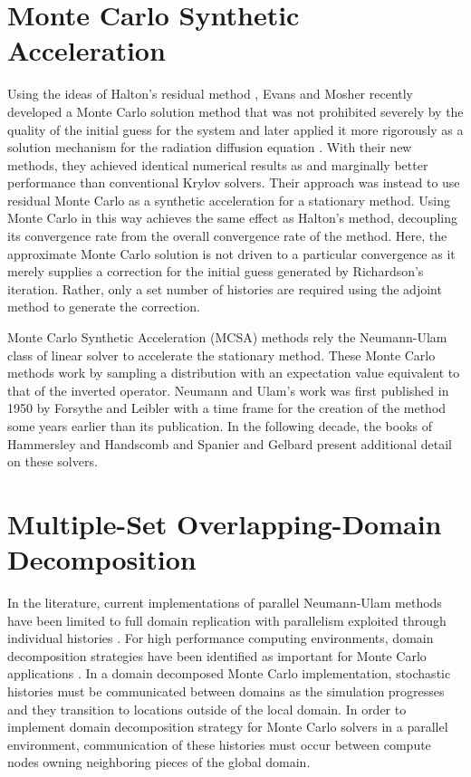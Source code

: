 \documentclass{snamc2013}
\begin{document}
\section{Monte Carlo Synthetic Acceleration}

Using the ideas of Halton's residual method
\cite{halton_sequential_1994}, Evans and Mosher recently developed a
Monte Carlo solution method that was not prohibited severely by the
quality of the initial guess for the system \cite{evans_monte_2009}
and later applied it more rigorously as a solution mechanism for the
radiation diffusion equation \cite{evans_monte_2012}. With their new
methods, they achieved identical numerical results as and marginally
better performance than conventional Krylov solvers. Their approach
was instead to use residual Monte Carlo as a synthetic acceleration
for a stationary method. Using Monte Carlo in this way achieves the
same effect as Halton's method, decoupling its convergence rate from
the overall convergence rate of the method. Here, the approximate
Monte Carlo solution is not driven to a particular convergence as it
merely supplies a correction for the initial guess generated by
Richardson's iteration. Rather, only a set number of histories are
required using the adjoint method to generate the correction.

Monte Carlo Synthetic Acceleration (MCSA) methods rely the
Neumann-Ulam class of linear solver to accelerate the stationary
method. These Monte Carlo methods work by sampling a distribution with
an expectation value equivalent to that of the inverted
operator. Neumann and Ulam's work was first published in 1950 by
Forsythe and Leibler \cite{forsythe_matrix_1950} with a time frame for
the creation of the method some years earlier than its publication. In
the following decade, the books of Hammersley and Handscomb
\cite{hammersley_monte_1964} and Spanier and Gelbard
\cite{spanier_monte_1969} present additional detail on these solvers.

\section{Multiple-Set Overlapping-Domain Decomposition}

In the literature, current implementations of parallel Neumann-Ulam
methods have been limited to full domain replication with parallelism
exploited through individual histories
\cite{alexandrov_efficient_1998}. For high performance computing
environments, domain decomposition strategies have been identified as
important for Monte Carlo applications
\cite{brunner_comparison_2006,siegel_analysis_2012}. In a domain
decomposed Monte Carlo implementation, stochastic histories must be
communicated between domains as the simulation progresses and they
transition to locations outside of the local domain. In order to
implement domain decomposition strategy for Monte Carlo solvers in a
parallel environment, communication of these histories must occur
between compute nodes owning neighboring pieces of the global domain.
\end{document}
